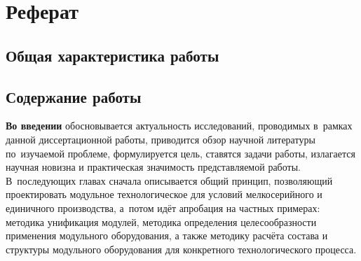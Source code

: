 \chapter*{Реферат}                      

\section*{Общая характеристика работы}

\newcommand{\actuality}{{\textbf\actualityTXT}}
\newcommand{\progress}{{\textbf\progressTXT}}
\newcommand{\aim}{{\textbf\aimTXT}}
\newcommand{\tasks}{\textbf{\tasksTXT}}
\newcommand{\novelty}{\textbf{\noveltyTXT}}
\newcommand{\influence}{\textbf{\influenceTXT}}
\newcommand{\methods}{\textbf{\methodsTXT}}
\newcommand{\defpositions}{\textbf{\defpositionsTXT}}
\newcommand{\reliability}{\textbf{\reliabilityTXT}}
\newcommand{\probation}{\textbf{\probationTXT}}
\newcommand{\contribution}{\textbf{\contributionTXT}}
\newcommand{\publications}{\textbf{\publicationsTXT}}
\newcommand{\implementation}{\textbf{\implementationTXT}}





\section*{Содержание работы}
\textbf{Во введении} обосновывается актуальность
исследований, проводимых в~рамках данной диссертационной работы,
приводится обзор научной литературы по~изучаемой проблеме,
формулируется цель, ставятся задачи работы, излагается научная новизна
и практическая значимость представляемой работы. В~последующих главах
сначала описывается общий принцип, позволяющий проектировать модульное технологическое для условий мелкосерийного и единичного производства, 
а~потом идёт апробация на частных примерах: методика унификация модулей, методика определения целесообразности применения модульного оборудования, а также методику расчёта состава и структуры модульного оборудования для конкретного технологического процесса.


